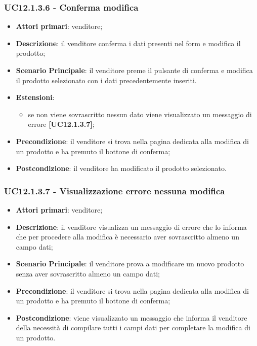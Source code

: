 \subsubsection{UC12.1.3.6 - Conferma modifica}
\begin{itemize}
\item \textbf{Attori primari}: venditore;
\item \textbf{Descrizione}: il venditore conferma i dati presenti nel form e modifica il prodotto;
\item \textbf{Scenario Principale}: il venditore preme il pulsante di conferma e modifica il prodotto selezionato con i dati precedentemente inseriti.
\item \textbf{Estensioni}: 
\begin{itemize}
	\item se non viene sovrascritto nessun dato viene visualizzato un messaggio di errore \textbf{[UC12.1.3.7]};
\end{itemize} 
\item \textbf{Precondizione}: il venditore si trova nella pagina dedicata alla modifica di un prodotto e ha premuto il bottone di conferma;
\item \textbf{Postcondizione}: il venditore ha modificato il prodotto selezionato.
\end{itemize}

\subsubsection{UC12.1.3.7 - Visualizzazione errore nessuna modifica}
\begin{itemize}
\item \textbf{Attori primari}: venditore;
\item \textbf{Descrizione}: il venditore visualizza un messaggio di errore che lo informa che per procedere alla modifica è necessario aver sovrascritto almeno un campo dati;
\item \textbf{Scenario Principale}: il venditore prova a modificare un nuovo prodotto senza aver sovrascritto almeno un campo dati;
\item \textbf{Precondizione}: il venditore si trova nella pagina dedicata alla modifica di un prodotto e ha premuto il bottone di conferma;
\item \textbf{Postcondizione}: viene visualizzato un messaggio che informa il venditore della necessità di compilare tutti i campi dati per completare la modifica di un prodotto.
\end{itemize}

